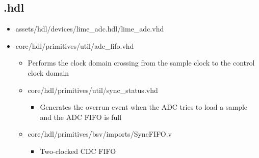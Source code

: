 \subsection*{\comp.hdl}
\begin{itemize}
	\item assets/hdl/devices/lime\_adc.hdl/lime\_adc.vhd
	\item core/hdl/primitives/util/adc\_fifo.vhd
    \begin{itemize}
    		\item Performs the clock domain crossing from the sample clock to the control clock domain
    \end{itemize}
	\begin{itemize}
		\item core/hdl/primitives/util/sync\_status.vhd
	    \begin{itemize}
    			\item Generates the overrun event when the ADC tries to load a	sample and the ADC FIFO is full
		\end{itemize}
		\item core/hdl/primitives/bsv/imports/SyncFIFO.v
    		\begin{itemize}
		    	\item Two-clocked CDC FIFO
	    \end{itemize}
	\end{itemize}

\end{itemize}
